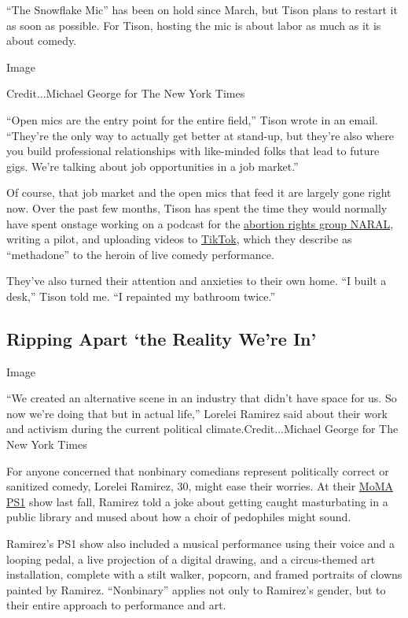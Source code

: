 ``The Snowflake Mic'' has been on hold since March, but Tison plans to
restart it as soon as possible. For Tison, hosting the mic is about
labor as much as it is about comedy.

Image

Credit...Michael George for The New York Times

``Open mics are the entry point for the entire field,'' Tison wrote in
an email. ``They're the only way to actually get better at stand-up, but
they're also where you build professional relationships with like-minded
folks that lead to future gigs. We're talking about job opportunities in
a job market.''

Of course, that job market and the open mics that feed it are largely
gone right now. Over the past few months, Tison has spent the time they
would normally have spent onstage working on a podcast for the
\href{https://shop.naral.org/products/book}{abortion rights group
NARAL}, writing a pilot, and uploading videos to
\href{https://www.tiktok.com/@james.tison?lang=en}{TikTok}, which they
describe as ``methadone'' to the heroin of live comedy performance.

They've also turned their attention and anxieties to their own home. ``I
built a desk,'' Tison told me. ``I repainted my bathroom twice.''

\hypertarget{ripping-apart-the-reality-were-in}{%
\subsection{Ripping Apart `the Reality We're
In'}\label{ripping-apart-the-reality-were-in}}

Image

``We created an alternative scene in an industry that didn't have space
for us. So now we're doing that but in actual life,'' Lorelei Ramirez
said about their work and activism during the current political
climate.Credit...Michael George for The New York Times

For anyone concerned that nonbinary comedians represent politically
correct or sanitized comedy, Lorelei Ramirez, 30, might ease their
worries. At their \href{https://www.moma.org/calendar/events/5931}{MoMA
PS1} show last fall, Ramirez told a joke about getting caught
masturbating in a public library and mused about how a choir of
pedophiles might sound.

Ramirez's PS1 show also included a musical performance using their voice
and a looping pedal, a live projection of a digital drawing, and a
circus-themed art installation, complete with a stilt walker, popcorn,
and framed portraits of clowns painted by Ramirez. ``Nonbinary'' applies
not only to Ramirez's gender, but to their entire approach to
performance and art.

